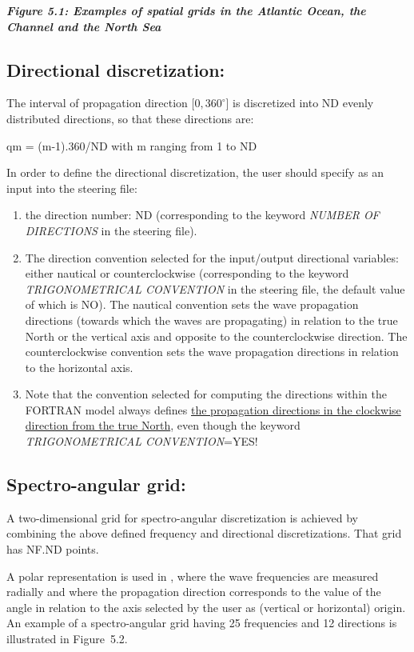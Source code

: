  \textbf{\textit{Figure 5.1: Examples of spatial grids in the Atlantic Ocean, the Channel and the North Sea}}


\subsection{  Directional discretization:}

 The interval of propagation direction $[0, 360^\circ$] is discretized into ND evenly distributed directions, so that these directions are:

 qm = (m-1).360/ND   with m ranging from 1 to ND

 In order to define the directional discretization, the user should specify as an input into the steering file:

\begin{enumerate}
\item  the direction number: ND (corresponding to the keyword \textit{NUMBER OF DIRECTIONS} in the steering file).

\item  The direction convention selected for the input/output directional variables: either nautical or counterclockwise (corresponding to the keyword \textit{TRIGONOMETRICAL CONVENTION} in the steering file, the default value of which is NO). The nautical convention sets the wave propagation directions (towards which the waves are propagating) in relation to the true North or the vertical axis and opposite to the counterclockwise direction. The counterclockwise convention sets the wave propagation directions in relation to the horizontal axis.

\item  Note that the convention selected for computing the directions within the FORTRAN model always defines \underline{the propagation directions in the clockwise direction from the true North}, even though the keyword \textit{TRIGONOMETRICAL CONVENTION}=YES!
\end{enumerate}


\subsection{ Spectro-angular grid:}

 A two-dimensional grid for spectro-angular discretization is achieved by combining the above defined frequency and directional discretizations. That grid has NF.ND points.

 A polar representation is used in \tomawac, where the wave frequencies are measured radially and where the propagation direction corresponds to the value of the angle in relation to the axis selected by the user as (vertical or horizontal) origin. An example of a spectro-angular grid having 25 frequencies and 12 directions is illustrated in Figure~5.2.


